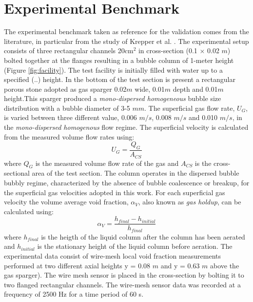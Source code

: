 \documentclass[11pt,a4paper]{article}
\begin{document}
\section{Experimental Benchmark}
\label{sec:2}
The  experimental benchmark taken as reference for the validation comes from the literature, in particular from the study of Krepper et al. \cite{krepper}. The experimental setup consists of three rectangular channels 20cm$^2$ in cross-section (0.1 × 0.02 $m$) bolted together at the flanges resulting in a bubble column of 1-meter height (Figure \ref{fig:facility}). The test facility is initially filled with water up to a specified (..) height. In the bottom of the test section is present a rectangular porous stone adopted as gas sparger 0.02$m$ wide, 0.01$m$ depth and 0.01$m$ height.This sparger produced a \textit{mono-dispersed homogeneous} bubble size distribution with a bubble diameter of 3-5 $mm$. The superficial gas flow rate, $U_G$, is varied between three different value, 0.006 $m/s$, 0.008 $m/s$ and 0.010 $m/s$, in the \textit{mono-dispersed homogenous} flow regime. The superficial velocity is calculated from the measured volume flow rates using: 
\begin{equation}
    U_G=\frac{Q_G}{A_{CS}}
\end{equation}
where $Q_G$ is the measured volume flow rate of the gas and $A_{CS}$ is the cross-sectional area of the test section. The column operates in the dispersed bubble bubbly regime, characterized by the absence of bubble coalescence or breakup, for the superficial gas velocities adopted in this work. For each superficial gas velocity the volume average void fraction, $\alpha_V$, also known as \textit{gas holdup}, can be calculated using: 
\begin{equation}
    \alpha_V=\frac{h_{final}-h_{initial}}{h_{final}}
\end{equation}
where $h_{final}$ is the heigth of the liquid column after the column has been aerated and $h_{initial}$ is the stationary height of the liquid column before aeration. The experimental data consist of wire-mesh local void fraction measurements performed at two different axial heights y = 0.08 $m$ and y = 0.63 $m$ above the gas sparger). The wire mesh sensor is placed in the cross-section by bolting it to two flanged rectangular channels. The wire-mesh sensor data was recorded at a frequency of 2500 Hz for a time period of 60 s. 
\end{document}
